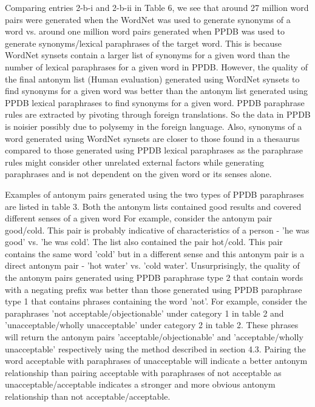 \documentclass[11pt]{article}
\begin{document}
Comparing entries 2-b-i and 2-b-ii in Table 6, we see that around 27 million word pairs were generated when the WordNet was used to generate synonyms of a word vs. around one million word pairs generated when PPDB was used to generate synonyms/lexical paraphrases of the target word. This is because WordNet synsets contain a larger list of synonyms for a given word than the number of lexical paraphrases for a given word in PPDB. However, the quality of the final antonym list (Human evaluation) generated using WordNet synsets to find synonyms for a given word was better than the antonym list generated using PPDB lexical paraphrases to find synonyms for a given word. PPDB paraphrase rules are extracted by pivoting through foreign translations. So the data in PPDB is noisier possibly due to polysemy in the foreign language. Also, synonyms of a word generated using WordNet synsets are closer to those found in a thesaurus compared to those generated using PPDB lexical paraphrases as the paraphrase rules might consider other unrelated external factors while generating paraphrases and is not dependent on the given word or its senses alone. 

Examples of antonym pairs generated using the two types of PPDB paraphrases are listed in table 3. Both the antonym lists contained good results and covered different senses of a given word For example, consider the antonym pair good/cold. This pair is probably indicative of characteristics of a person - 'he was good' vs. 'he was cold'. The list also contained the pair hot/cold. This pair contains the same word 'cold' but in a different sense and this antonym pair is a direct antonym pair - 'hot water' vs. 'cold water'. Unsurprisingly, the quality of the antonym pairs generated using PPDB paraphrase type 2 that contain words with a negating prefix was better than those generated using PPDB paraphrase type 1 that contains phrases containing the word 'not'. For example, consider the paraphrases 'not acceptable/objectionable' under category 1 in table 2 and 'unacceptable/wholly unacceptable' under category 2 in table 2. These phrases will return the antonym pairs 'acceptable/objectionable' and 'acceptable/wholly unacceptable' respectively using the method described in section 4.3. Pairing the word acceptable with paraphrases of unacceptable will indicate a better antonym relationship than pairing acceptable with paraphrases of not acceptable as unacceptable/acceptable indicates a stronger and more obvious antonym relationship than not acceptable/acceptable.  
\end{document}
